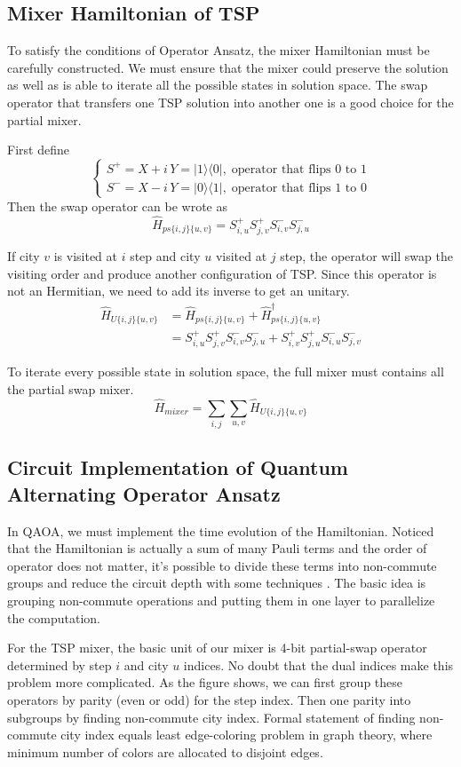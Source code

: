 \documentclass[aps,pra,twocolumn,superscriptaddress]{revtex4-2}
\begin{document}
\subsection{Mixer Hamiltonian of TSP}
To satisfy the conditions of Operator Ansatz, the mixer Hamiltonian must be carefully constructed. We must ensure that the mixer could preserve the solution as well as is able to iterate all the possible states in solution space. The swap operator that transfers one TSP solution into another one is a good choice for the partial mixer.

First define
$$
\begin{cases}
S^+=X+i\,Y=|1\rangle\langle 0|,\; \text{operator that flips 0 to 1}\\
S^-=X-i\, Y=|0\rangle\langle 1|,\; \text{operator that flips 1 to 0}
\end{cases}
$$
Then the swap operator can be wrote as
$$
\hat H_{ps\{i,j\}\{u,v\}}=S^+_{i,u} S^+_{j,v} S^-_{i,v} S^-_{j,u}
$$

If city $v$ is visited at $i$ step and city $u$ visited at $j$ step, the operator will swap the visiting order and produce another configuration of TSP. Since this operator is not an Hermitian, we need to add its inverse to get an unitary.
$$
\begin{aligned}
   \hat H_{U\{i,j\}\{u,v\}}&= \hat H_{ps\{i,j\}\{u,v\}}+\hat H_{ps\{i,j\}\{u,v\}}^\dagger \\
&=S^+_{i,u} S^+_{j,v} S^-_{i,v} S^-_{j,u}+S^+_{i,v} S^+_{j,u} S^-_{i,u} S^-_{j,v}
\end{aligned}
$$

To iterate every possible state in solution space, the full mixer must contains all the partial swap mixer.
$$
\hat H_{mixer}=\sum_{i,j}\sum_{u,v}\hat H_{U\{i,j\}\{u,v\}}
$$
\subsection{Circuit Implementation of Quantum Alternating Operator Ansatz}
In QAOA, we must implement the time evolution of the Hamiltonian. Noticed that the Hamiltonian is actually a sum of many Pauli terms and the order of operator does not matter, it's possible to divide these terms into non-commute groups and reduce the circuit depth with some techniques \cite{}. The basic idea is grouping non-commute operations and putting them in one layer to parallelize the computation. 

For the TSP mixer, the basic unit of our mixer is 4-bit partial-swap operator determined by step $i$ and city $u$ indices. No doubt that the dual indices make this problem more complicated. As the figure shows, we can first group these operators by parity (even or odd) for the step index. Then one parity into subgroups by finding non-commute city index. Formal statement of finding non-commute city index equals least edge-coloring problem in graph theory, where minimum number of colors are allocated to disjoint edges.
\end{document}
